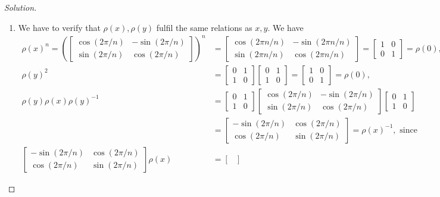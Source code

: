 \begin{proof}[Solution]
\begin{enumerate}[font=\normalfont,label=\textbf{(\alph*)}, wide]
\item We have to verify that $\rho(x), \rho(y)$ fulfil the same relations as $x, y$. We have
\[
\begin{aligned}
\rho(x)^n = 
\left(
\begin{bmatrix}
\cos(2\pi/n) & -\sin(2\pi/n) \\
\sin(2\pi/n) & \cos(2\pi/n)
\end{bmatrix}
\right)^n &= 
\begin{bmatrix}
\cos(2\pi n/n) & -\sin(2\pi n/n) \\
\sin(2\pi n/n) & \cos(2\pi n/n)
\end{bmatrix}
= 
\begin{bmatrix}
1 & 0 \\
0 & 1
\end{bmatrix}
= \rho(0), \\
\rho(y)^2 &= 
\begin{bmatrix}
0 & 1 \\
1 & 0
\end{bmatrix}
\begin{bmatrix}
0 & 1 \\
1 & 0
\end{bmatrix}
= 
\begin{bmatrix}
1 & 0 \\
0 & 1
\end{bmatrix}
= \rho(0), \\
\rho(y)\rho(x)\rho(y)^{-1} &=
\begin{bmatrix}
0 & 1 \\
1 & 0
\end{bmatrix}
\begin{bmatrix}
\cos(2\pi/n) & -\sin(2\pi/n) \\
\sin(2\pi/n) & \cos(2\pi/n)
\end{bmatrix}
\begin{bmatrix}
0 & 1 \\
1 & 0
\end{bmatrix}
\\
&= 
\begin{bmatrix}
-\sin(2\pi/n) & \cos(2\pi/n) \\
\cos(2\pi/n) & \sin(2\pi/n) 
\end{bmatrix}
= \rho(x)^{-1}, \text{ since} \\
\begin{bmatrix}
-\sin(2\pi/n) & \cos(2\pi/n) \\
\cos(2\pi/n) & \sin(2\pi/n) 
\end{bmatrix}
\rho(x) &= 
\begin{bmatrix}

\end{bmatrix}
\end{aligned}\]
\end{enumerate}
\end{proof}
